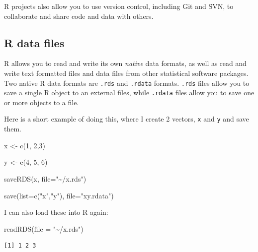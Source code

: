 \documentclass[
  letterpaper,
  DIV=11,
  numbers=noendperiod]{scrreprt}
\newenvironment{Shaded}{\begin{snugshade}}{\end{snugshade}}
\newcommand{\AttributeTok}[1]{\textcolor[rgb]{0.40,0.45,0.13}{#1}}
\newcommand{\DecValTok}[1]{\textcolor[rgb]{0.68,0.00,0.00}{#1}}
\newcommand{\FunctionTok}[1]{\textcolor[rgb]{0.28,0.35,0.67}{#1}}
\newcommand{\NormalTok}[1]{\textcolor[rgb]{0.00,0.23,0.31}{#1}}
\newcommand{\OtherTok}[1]{\textcolor[rgb]{0.00,0.23,0.31}{#1}}
\newcommand{\StringTok}[1]{\textcolor[rgb]{0.13,0.47,0.30}{#1}}
\begin{document}
R projects also allow you to use version control, including Git and SVN,
to collaborate and share code and data with others.

\hypertarget{r-data-files}{%
\subsection{R data files}\label{r-data-files}}

R allows you to read and write its own \emph{native} data formats, as
well as read and write text formatted files and data files from other
statistical software packages. Two native R data formats are
\texttt{.rds} and \texttt{.rdata} formats. \texttt{.rds} files allow you
to save a single R object to an external files, while \texttt{.rdata}
files allow you to save one or more objects to a file.

Here is a short example of doing this, where I create 2 vectors,
\texttt{x} and \texttt{y} and save them.

\begin{Shaded}
\begin{Highlighting}[]
\NormalTok{x }\OtherTok{\textless{}{-}} \FunctionTok{c}\NormalTok{(}\DecValTok{1}\NormalTok{, }\DecValTok{2}\NormalTok{,}\DecValTok{3}\NormalTok{)}

\NormalTok{y }\OtherTok{\textless{}{-}} \FunctionTok{c}\NormalTok{(}\DecValTok{4}\NormalTok{, }\DecValTok{5}\NormalTok{, }\DecValTok{6}\NormalTok{)}

\FunctionTok{saveRDS}\NormalTok{(x, }
        \AttributeTok{file=}\StringTok{"\textasciitilde{}/x.rds"}\NormalTok{)}

\FunctionTok{save}\NormalTok{(}\AttributeTok{list=}\FunctionTok{c}\NormalTok{(}\StringTok{"x"}\NormalTok{,}\StringTok{"y"}\NormalTok{),}
     \AttributeTok{file=}\StringTok{"xy.rdata"}\NormalTok{)}
\end{Highlighting}
\end{Shaded}

I can also load these into R again:

\begin{Shaded}
\begin{Highlighting}[]
\FunctionTok{readRDS}\NormalTok{(}\AttributeTok{file =} \StringTok{"\textasciitilde{}/x.rds"}\NormalTok{)}
\end{Highlighting}
\end{Shaded}

\begin{verbatim}
[1] 1 2 3
\end{verbatim}
\end{document}
